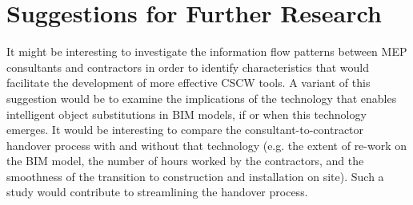 

\section{Suggestions for Further Research}

It might be interesting to investigate the information flow patterns between MEP consultants and contractors in order to identify characteristics that would facilitate the development of more effective CSCW tools.
A variant of this suggestion would be to examine the implications of the technology that enables intelligent object substitutions in BIM models, if or when this technology emerges.
It would be interesting to compare the consultant-to-contractor handover process with and without that technology (e.g. the extent of re-work on the BIM model, the number of hours worked by the contractors, and the smoothness of the transition to construction and installation on site).
Such a study would contribute to streamlining the handover process. %

